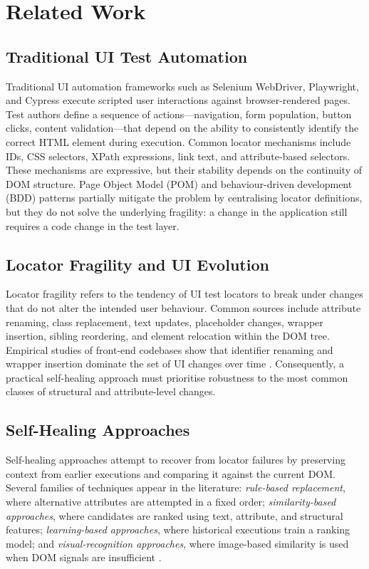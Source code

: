 \documentclass[12pt]{article}
\begin{document}
\section{Related Work}
\label{sec:related}

\subsection{Traditional UI Test Automation}

Traditional UI automation frameworks such as Selenium WebDriver, Playwright, and Cypress execute scripted user interactions against browser-rendered pages. Test authors define a sequence of actions---navigation, form population, button clicks, content validation---that depend on the ability to consistently identify the correct HTML element during execution. Common locator mechanisms include IDs, CSS selectors, XPath expressions, link text, and attribute-based selectors. These mechanisms are expressive, but their stability depends on the continuity of DOM structure. Page Object Model (POM) and behaviour-driven development (BDD) patterns partially mitigate the problem by centralising locator definitions, but they do not solve the underlying fragility: a change in the application still requires a code change in the test layer.

\subsection{Locator Fragility and UI Evolution}

Locator fragility refers to the tendency of UI test locators to break under changes that do not alter the intended user behaviour. Common sources include attribute renaming, class replacement, text updates, placeholder changes, wrapper insertion, sibling reordering, and element relocation within the DOM tree. Empirical studies of front-end codebases show that identifier renaming and wrapper insertion dominate the set of UI changes over time \citep{hammoudi2016, stocco2018}. Consequently, a practical self-healing approach must prioritise robustness to the most common classes of structural and attribute-level changes.

\subsection{Self-Healing Approaches}

Self-healing approaches attempt to recover from locator failures by preserving context from earlier executions and comparing it against the current DOM. Several families of techniques appear in the literature: \emph{rule-based replacement}, where alternative attributes are attempted in a fixed order; \emph{similarity-based approaches}, where candidates are ranked using text, attribute, and structural features; \emph{learning-based approaches}, where historical executions train a ranking model; and \emph{visual-recognition approaches}, where image-based similarity is used when DOM signals are insufficient \citep{yandrapally2014, stocco2018, ricca2019}.
\end{document}
